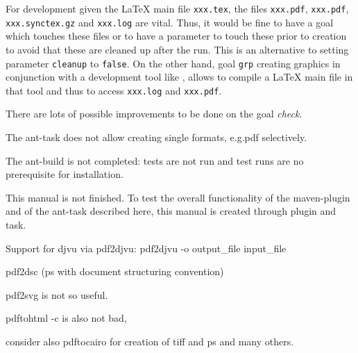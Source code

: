 For development given the \LaTeX{} main file \texttt{xxx.tex}, 
the files \texttt{xxx.pdf}, \texttt{xxx.pdf}, \texttt{xxx.synctex.gz} 
and \texttt{xxx.log} are vital. 
Thus, it would be fine to have a goal which touches these files 
or to have a parameter to touch these prior to creation 
to avoid that these are cleaned up after the run. 
This is an alternative to setting parameter \texttt{cleanup} to \texttt{false}. 
On the other hand, goal \texttt{grp} creating graphics 
in conjunction with a development tool like , 
allows to compile a \LaTeX{} main file in that tool 
and thus to access \texttt{xxx.log} and \texttt{xxx.pdf}. 

There are lots of possible improvements to be done on the goal \emph{check}. 


The ant-task does not allow creating single formats, e.g.\@ pdf selectively. 

The ant-build is not completed: tests are not run and 
test runs are no prerequisite for installation. 

This manual is not finished. 
To test the overall functionality of the maven-plugin and of the ant-task 
described here, this manual is created through plugin and task. 

Support for djvu via pdf2djvu: 
pdf2djvu -o output\_file input\_file

pdf2dsc
(ps with document structuring convention) 

pdf2svg is not so useful. 

pdftohtml -c is also not bad, 

consider also pdftocairo for creation of tiff and ps and many others. 
